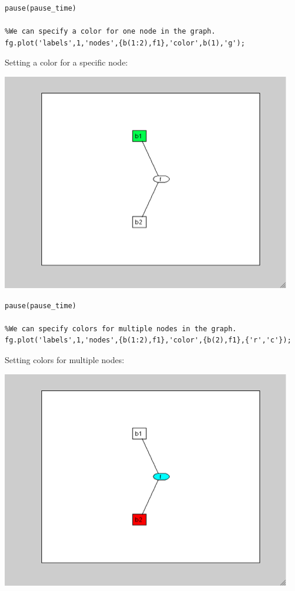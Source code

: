 \begin{lstlisting}
pause(pause_time)
 
%We can specify a color for one node in the graph.
fg.plot('labels',1,'nodes',{b(1:2),f1},'color',b(1),'g');
\end{lstlisting}

Setting a color for a specific node:
 
\includegraphics{images/plot5.png}
 
\begin{lstlisting}
pause(pause_time)
 
%We can specify colors for multiple nodes in the graph.
fg.plot('labels',1,'nodes',{b(1:2),f1},'color',{b(2),f1},{'r','c'});
\end{lstlisting}

Setting colors for multiple nodes:

\includegraphics{images/plot6.png}

